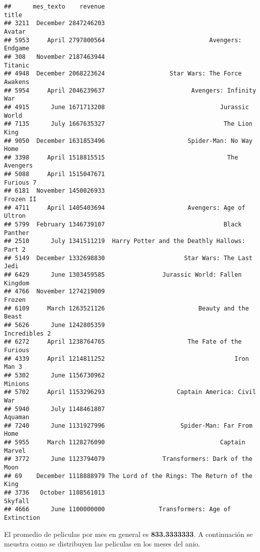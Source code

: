 \documentclass[
]{article}
\begin{document}
\begin{verbatim}
##      mes_texto    revenue                                         title
## 3211  December 2847246203                                        Avatar
## 5953     April 2797800564                             Avengers: Endgame
## 308   November 2187463944                                       Titanic
## 4948  December 2068223624                  Star Wars: The Force Awakens
## 5954     April 2046239637                        Avengers: Infinity War
## 4915      June 1671713208                                Jurassic World
## 7135      July 1667635327                                 The Lion King
## 9050  December 1631853496                       Spider-Man: No Way Home
## 3398     April 1518815515                                  The Avengers
## 5088     April 1515047671                                     Furious 7
## 6181  November 1450026933                                     Frozen II
## 4711     April 1405403694                       Avengers: Age of Ultron
## 5799  February 1346739107                                 Black Panther
## 2510      July 1341511219  Harry Potter and the Deathly Hallows: Part 2
## 5149  December 1332698830                      Star Wars: The Last Jedi
## 6429      June 1303459585                Jurassic World: Fallen Kingdom
## 4766  November 1274219009                                        Frozen
## 6109     March 1263521126                          Beauty and the Beast
## 5626      June 1242805359                                 Incredibles 2
## 6272     April 1238764765                       The Fate of the Furious
## 4339     April 1214811252                                    Iron Man 3
## 5302      June 1156730962                                       Minions
## 5702     April 1153296293                    Captain America: Civil War
## 5940      July 1148461807                                       Aquaman
## 7240      June 1131927996                     Spider-Man: Far From Home
## 5955     March 1128276090                                Captain Marvel
## 3772      June 1123794079                Transformers: Dark of the Moon
## 69    December 1118888979 The Lord of the Rings: The Return of the King
## 3736   October 1108561013                                       Skyfall
## 4666      June 1100000000               Transformers: Age of Extinction
\end{verbatim}

El promedio de peliculas por mes en general es \textbf{833.3333333}. A
continuación se meustra como se distribuyen las peliculas en los meses
del anio.
\end{document}
